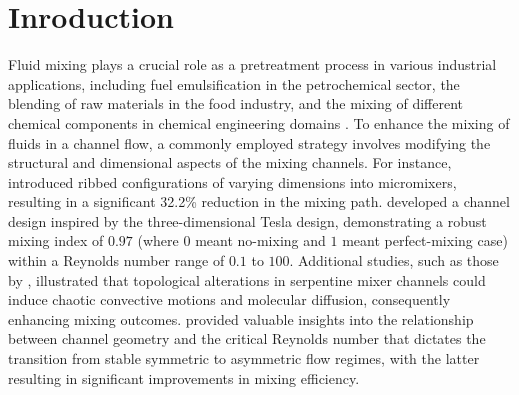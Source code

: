 \documentclass[%
 aip,
 amsmath,amssymb,
 reprint,
]{revtex4-1}
\begin{document}
\section{Inroduction}
\label{sec:headings}
Fluid mixing plays a crucial role as a pretreatment process in various industrial applications, including fuel emulsification in the petrochemical sector, the blending of raw materials in the food industry, and the mixing of different chemical components in chemical engineering domains \citep{Peterwitz2021,Wang2021, Nunez-Flores2020, Yeh2015}. To enhance the mixing of fluids in a channel flow, a commonly employed strategy involves modifying the structural and dimensional aspects of the mixing channels. For instance, \cite{Kim2011} introduced ribbed configurations of varying dimensions into micromixers, resulting in a significant 32.2\% reduction in the mixing path. \cite{Yang2015} developed a channel design inspired by the three-dimensional Tesla design, demonstrating a robust mixing index of $0.97$ (where $0$ meant no-mixing and $1$ meant perfect-mixing case) within a Reynolds number range of $0.1$ to $100$. Additional studies, such as those by \cite{Chen2016}, illustrated that topological alterations in serpentine mixer channels could induce chaotic convective motions and molecular diffusion, consequently enhancing mixing outcomes. \cite{Lobasov2018} provided valuable insights into the relationship between channel geometry and the critical Reynolds number that dictates the transition from stable symmetric to asymmetric flow regimes, with the latter resulting in significant improvements in mixing efficiency.
\end{document}
